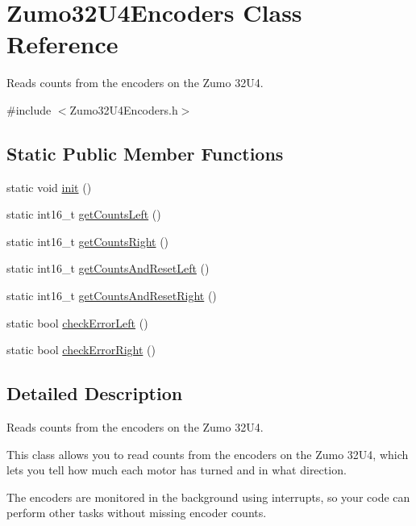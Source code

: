 \hypertarget{class_zumo32_u4_encoders}{}\section{Zumo32\+U4\+Encoders Class Reference}
\label{class_zumo32_u4_encoders}


Reads counts from the encoders on the Zumo 32\+U4.  




{\ttfamily \#include $<$Zumo32\+U4\+Encoders.\+h$>$}

\subsection*{Static Public Member Functions}
\begin{DoxyCompactItemize}
\item 
static void \hyperlink{class_zumo32_u4_encoders_afa1199db1c88dce2e42a461dc45df560}{init} ()
\item 
static int16\+\_\+t \hyperlink{class_zumo32_u4_encoders_a142d33610a12b209e257c1635b2daae6}{get\+Counts\+Left} ()
\item 
static int16\+\_\+t \hyperlink{class_zumo32_u4_encoders_ad570df0c84cbb719dc975233b4f65756}{get\+Counts\+Right} ()
\item 
static int16\+\_\+t \hyperlink{class_zumo32_u4_encoders_a9b212103e652d1edb9d622381c303497}{get\+Counts\+And\+Reset\+Left} ()
\item 
static int16\+\_\+t \hyperlink{class_zumo32_u4_encoders_a613358c24dbc997cb9fee36d66bbf2ba}{get\+Counts\+And\+Reset\+Right} ()
\item 
static bool \hyperlink{class_zumo32_u4_encoders_ad20765947ef87f562a4a19975a7fb9ca}{check\+Error\+Left} ()
\item 
static bool \hyperlink{class_zumo32_u4_encoders_a9d7de11def7409becbe870056ef2d719}{check\+Error\+Right} ()
\end{DoxyCompactItemize}


\subsection{Detailed Description}
Reads counts from the encoders on the Zumo 32\+U4. 

This class allows you to read counts from the encoders on the Zumo 32\+U4, which lets you tell how much each motor has turned and in what direction.

The encoders are monitored in the background using interrupts, so your code can perform other tasks without missing encoder counts.

